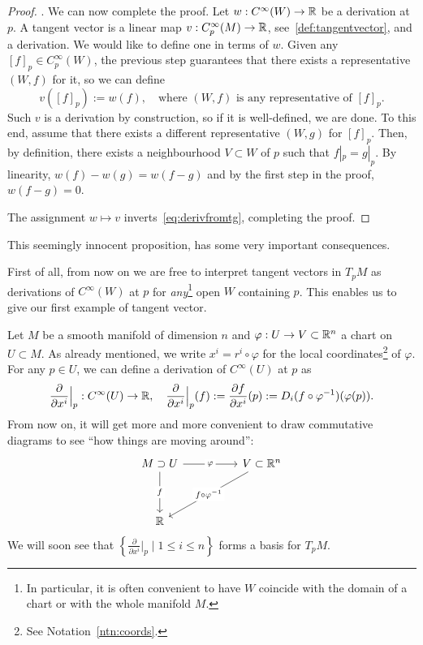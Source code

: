 \begin{proof}
  . We can now complete the proof.
  Let $w:C^\infty(W) \to\mathbb{R}$ be a derivation at $p$.
  A tangent vector is a linear map $v:C_p^\infty(M)\to\mathbb{R}$, see~\eqref{def:tangentvector}, and a derivation.
  We would like to define one in terms of $w$.
  Given any $[f]_p\in C_p^\infty(W)$, the previous step guarantees that there exists a representative $(W,f)$ for it, so we can define
  \begin{equation}
    v([f]_p) := w(f), \quad\mbox{where $(W,f)$ is any representative of $[f]_p$}.
  \end{equation}
  Such $v$ is a derivation by construction, so if it is well-defined, we are done.
  To this end, assume that there exists a different representative $(W, g)$ for $[f]_p$.
  Then, by definition, there exists a neighbourhood $V\subset W$ of $p$ such that $f|_p = g|_p$.
  By linearity, $w(f) - w(g) = w(f-g)$ and by the first step in the proof, $w(f-g) = 0$.
  
  The assignment $w\mapsto v$ inverts~\eqref{eq:derivfromtg}, completing the proof.
\end{proof}

This seemingly innocent proposition, has some very important consequences.

First of all, from now on we are free to interpret tangent vectors in $T_p M$ as derivations of $C^\infty(W)$ at $p$ for \emph{any}\footnote{In particular, it is often convenient to have $W$ coincide with the domain of a chart or with the whole manifold $M$.} open $W$ containing $p$.
This enables us to give our first example of tangent vector.

\begin{example}\label{ex:partialderivative}
  Let $M$ be a smooth manifold of dimension $n$ and $\varphi: U \to V\subset\mathbb{R}^n$ a chart on $U\subset M$.
  As already mentioned, we write $x^i = r^i \circ \varphi$ for the local coordinates\footnote{See Notation~\ref{ntn:coords}.} of $\varphi$.
  For any $p\in U$, we can define a derivation of $C^\infty(U)$ at $p$ as
  \begin{equation}
    \frac{\partial}{\partial x^i}\Big|_p : C^\infty(U) \to \mathbb{R}, \quad
    \frac{\partial}{\partial x^i}\Big|_p (f) := \frac{\partial f}{\partial x^i}(p) := D_i(f\circ\varphi^{-1})(\varphi(p)).
  \end{equation}
  From now on, it will get more and more convenient to draw commutative diagrams to see ``how things are moving around'':
  \begin{equation}
    \begin{tikzcd}[column sep = huge, row sep = huge]
      M\supset U \arrow[r, "\varphi" description] \arrow[d, "f" description] & V \subset\R^n \arrow [dl, "f\circ\varphi^{-1}" description]\\
      \R &
    \end{tikzcd}
  \end{equation}
  We will soon see that $\left\{\frac{\partial}{\partial x^i}\Big|_p \mid 1\leq i\leq n\right\}$ forms a basis for $T_p M$.
\end{example}


